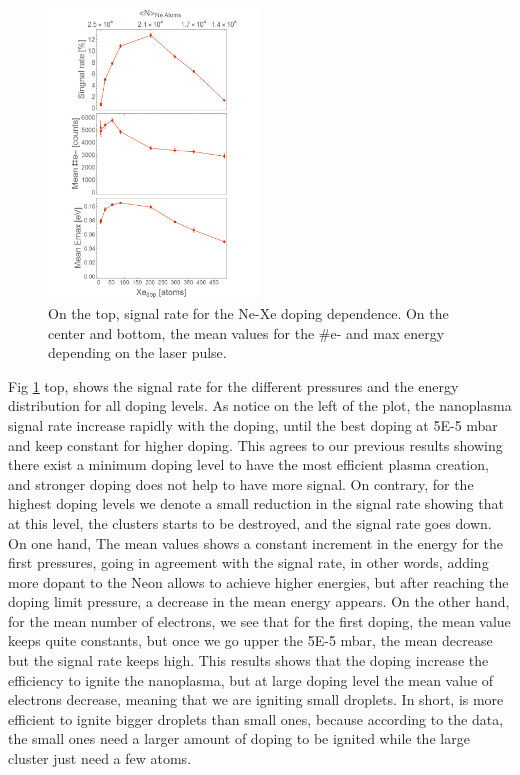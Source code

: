 \begin{figure}[hbtp]
\centering
\includegraphics[width=0.5\textwidth]{../Images/results/MIR_Ne_XeDop_39K/Alltogether.png}
\caption[MIR Ne-Xe. Signal rate and mean values]{On the top, signal rate for the Ne-Xe doping dependence. On the center and bottom, the mean values for the $\#$e- and max energy depending on the laser pulse.}
\label{fig:NeXeall}
\end{figure}

Fig \ref{fig:NeXeall} top, shows the signal rate for the different pressures and the energy distribution for all doping levels. As notice on the left of the plot, the nanoplasma signal rate increase rapidly with the doping, until the best doping at 5E-5 mbar and keep constant for higher doping. This agrees to our previous results showing there exist a minimum doping level to have the most efficient plasma creation, and stronger doping does not help to have more signal. On contrary, for the highest doping levels we denote a small reduction in the signal rate showing that at this level, the clusters starts to be destroyed, and the signal rate goes down.
On one hand,  The mean values shows a constant increment in the energy for the first pressures, going in agreement with the signal rate, in other words, adding more dopant to the  Neon allows to achieve higher energies, but after reaching the doping limit pressure, a decrease in the mean energy appears. On the other hand, for the mean number of electrons, we see that for the first doping, the mean value keeps quite constants, but once we go upper the 5E-5 mbar, the mean decrease but the signal rate keeps high. This results shows that the doping increase the efficiency to ignite the nanoplasma, but at large doping level the mean value of electrons decrease, meaning that we are igniting small droplets. In short, is more efficient to ignite bigger droplets than small ones, because according to the data, the small ones need a larger amount of doping to be ignited while the large cluster just need a few atoms.

